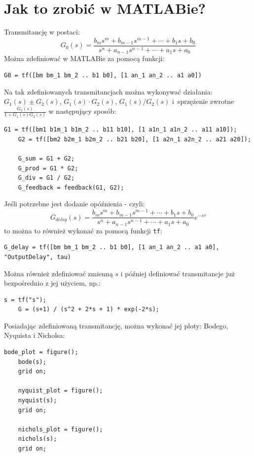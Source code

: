 \documentclass{article}
\begin{document}
\section{Jak to zrobić w MATLABie?}
Transmitancję w postaci:
$$
    G_{0}(s) = \frac{b_{m}s^{m} + b_{m-1}s^{m-1} + \cdots + b_{1}s + b_{0}}{s^{n} + a_{n-1}s^{n-1} + \cdots + a_{1}s + a_{0}}
$$
Można zdefiniować w MATLABie za pomocą funkcji:
\begin{lstlisting}[style=Matlab-editor]
    G0 = tf([bm bm_1 bm_2 .. b1 b0], [1 an_1 an_2 .. a1 a0])
\end{lstlisting}
Na tak zdefiniowanych transmitancjach można wykonywać działania: $G_{1}(s) \pm G_{2}(s)$, $G_{1}(s) \cdot G_{2}(s)$, $G_{1}(s) / G_{2}(s)$ i~sprzężenie zwrotne $\frac{G_{1}(s)}{1 + G_{1}(s)G_{2}(s)}$ w następujący sposób:
\begin{lstlisting}[style=Matlab-editor]
    G1 = tf([bm1 b1m_1 b1m_2 .. b11 b10], [1 a1n_1 a1n_2 .. a11 a10]);
    G2 = tf([bm2 b2m_1 b2m_2 .. b21 b20], [1 a2n_1 a2n_2 .. a21 a20]);

    G_sum = G1 + G2;
    G_prod = G1 * G2;
    G_div = G1 / G2;
    G_feedback = feedback(G1, G2);
\end{lstlisting}

Jeśli potrzebne jest dodanie opóźnienia - czyli:
$$
    G_{delay}(s) = \frac{b_{m}s^{m} + b_{m-1}s^{m-1} + \cdots + b_{1}s + b_{0}}{s^{n} + a_{n-1}s^{n-1} + \cdots + a_{1}s + a_{0}}e^{-s\tau}
$$
to można to również wykonać za pomocą funkcji \texttt{tf}:
\begin{lstlisting}[style=Matlab-editor]
    G_delay = tf([bm bm_1 bm_2 .. b1 b0], [1 an_1 an_2 .. a1 a0], "OutputDelay", tau)
\end{lstlisting}

Można również zdefiniować zmienną $s$ i później definiować transmitancje już bezpośrednio z jej użyciem, np.:
\begin{lstlisting}[style=Matlab-editor]
    s = tf("s");
    G = (s+1) / (s^2 + 2*s + 1) * exp(-2*s);
\end{lstlisting}

Posiadając zdefiniowaną transmitancję, można wykonać jej ploty: Bodego, Nyquista i Nicholsa:
\begin{lstlisting}[style=Matlab-editor]
    bode_plot = figure();
    bode(s);
    grid on;

    nyquist_plot = figure();
    nyquist(s);
    grid on;

    nichols_plot = figure();
    nichols(s);
    grid on;
\end{lstlisting}
\end{document}
